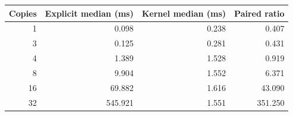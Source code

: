 \begin{center}
\begin{tabular}{rrrr}
\toprule
Copies & Explicit median (ms) & Kernel median (ms) & Paired ratio\\
\midrule
1 & 0.098 & 0.238 & 0.407\\
3 & 0.125 & 0.281 & 0.431\\
4 & 1.389 & 1.528 & 0.919\\
8 & 9.904 & 1.552 & 6.371\\
16 & 69.882 & 1.616 & 43.090\\
32 & 545.921 & 1.551 & 351.250\\
\bottomrule
\end{tabular}
\end{center}
